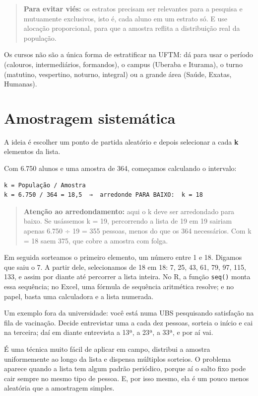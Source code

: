 \documentclass[
]{book}
\begin{document}
\begin{quote}
\textbf{Para evitar viés:} os estratos precisam ser relevantes para a pesquisa e mutuamente exclusivos, isto é, cada aluno em um estrato só. E use alocação proporcional, para que a amostra reflita a distribuição real da população.
\end{quote}

Os cursos não são a única forma de estratificar na UFTM: dá para usar o período (calouros, intermediários, formandos), o campus (Uberaba e Iturama), o turno (matutino, vespertino, noturno, integral) ou a grande área (Saúde, Exatas, Humanas).

\section{Amostragem sistemática}\label{amostragem-sistemuxe1tica}

A ideia é escolher um ponto de partida aleatório e depois selecionar a cada \textbf{k} elementos da lista.

Com 6.750 alunos e uma amostra de 364, começamos calculando o intervalo:

\begin{verbatim}
k = População / Amostra
k = 6.750 / 364 = 18,5  →  arredonde PARA BAIXO:  k = 18
\end{verbatim}

\begin{quote}
\textbf{Atenção ao arredondamento:} aqui o k deve ser arredondado para baixo. Se usássemos k = 19, percorrendo a lista de 19 em 19 sairiam apenas 6.750 ÷ 19 = 355 pessoas, menos do que os 364 necessários. Com k = 18 saem 375, que cobre a amostra com folga.
\end{quote}

Em seguida sorteamos o primeiro elemento, um número entre 1 e 18. Digamos que saiu o 7. A partir dele, selecionamos de 18 em 18: 7, 25, 43, 61, 79, 97, 115, 133, e assim por diante até percorrer a lista inteira. No R, a função \texttt{seq()} monta essa sequência; no Excel, uma fórmula de sequência aritmética resolve; e no papel, basta uma calculadora e a lista numerada.

Um exemplo fora da universidade: você está numa UBS pesquisando satisfação na fila de vacinação. Decide entrevistar uma a cada dez pessoas, sorteia o início e cai na terceira; daí em diante entrevista a 13ª, a 23ª, a 33ª, e por aí vai.

É uma técnica muito fácil de aplicar em campo, distribui a amostra uniformemente ao longo da lista e dispensa múltiplos sorteios. O problema aparece quando a lista tem algum padrão periódico, porque aí o salto fixo pode cair sempre no mesmo tipo de pessoa. E, por isso mesmo, ela é um pouco menos aleatória que a amostragem simples.
\end{document}
